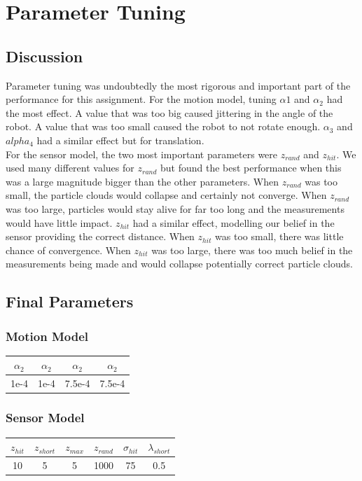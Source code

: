 \documentclass[12pt, a4paper]{article}
\begin{document}
\section{Parameter Tuning}
\subsection{Discussion}
Parameter tuning was undoubtedly the most rigorous and important part of the performance for this assignment. For the motion model, tuning $\alpha1$ and $\alpha_2$ had the most effect. A value that was too big caused jittering in the angle of the robot. A value that was too small caused the robot to not rotate enough. $\alpha_3$ and $alpha_4$ had a similar effect but for translation.\\

\noindent For the sensor model, the two most important parameters were $z_{rand}$ and $z_{hit}$. We used many different values for $z_{rand}$ but found the best performance when this was a large magnitude bigger than the other parameters. When $z_{rand}$ was too small, the particle clouds would collapse and certainly not converge. When $z_{rand}$ was too large, particles would stay alive for far too long and the measurements would have little impact. $z_{hit}$ had a similar effect, modelling our belief in the sensor providing the correct distance. When $z_{hit}$ was too small, there was little chance of convergence. When $z_{hit}$ was too large, there was too much belief in the measurements being made and would collapse potentially correct particle clouds.

\subsection{Final Parameters}
\subsubsection{Motion Model}
\begin{center}
\begin{tabular}{||c |c| c| c||} 
  \hline
  $\alpha_2$ & $\alpha_2$ & $\alpha_2$ & $\alpha_2$ \\
  \hline
  1e-4 & 1e-4 & 7.5e-4 & 7.5e-4 \\
  \hline
\end{tabular}
\end{center}

\subsubsection{Sensor Model}
\begin{center}
\begin{tabular}{||c | c | c | c | c | c||} 
  \hline
  $z_{hit}$ & $z_{short}$ & $z_{max}$ & $z_{rand}$ & $\sigma_{hit}$ & $\lambda_{short}$ \\
  \hline
  10 & 5 & 5 & 1000 & 75 & 0.5 \\
  \hline
\end{tabular}
\end{center}
\end{document}
